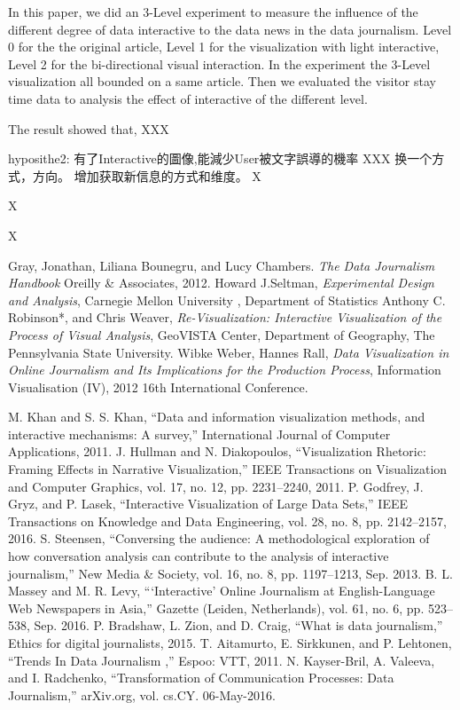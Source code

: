 \documentclass[9pt,journal,compsoc]{IEEEtran}
\begin{document}
In this paper, we did an 3-Level experiment to measure the influence of the different degree of data interactive to the data news in the data journalism.  Level 0 for the the original article, Level 1 for the visualization with light interactive, Level 2 for the bi-directional visual interaction. In the experiment the 3-Level visualization all bounded on a same article. Then we evaluated the visitor stay time data to analysis the effect of interactive of the different level.

The result showed that, XXX

hyposithe2: 有了Interactive的圖像,能減少User被文字誤導的機率
XXX 换一个方式，方向。 增加获取新信息的方式和维度。
X

X

X

\begin{thebibliography}{99}
{} Gray, Jonathan, Liliana Bounegru, and Lucy Chambers. \textit{The Data Journalism Handbook} Oreilly \& Associates, 2012.
 Howard J.Seltman, \textit{Experimental Design and Analysis}, Carnegie Mellon University , Department of Statistics
 Anthony C. Robinson*, and Chris Weaver, \textit{Re-Visualization: Interactive Visualization of the Process of Visual Analysis}, GeoVISTA Center, Department of Geography, The Pennsylvania State University. 
 Wibke Weber, Hannes Rall, \textit{Data Visualization in Online Journalism and Its Implications for the Production Process}, Information Visualisation (IV), 2012 16th International Conference.

 M. Khan and S. S. Khan, “Data and information visualization methods, and interactive mechanisms: A survey,” International Journal of Computer Applications, 2011.
 J. Hullman and N. Diakopoulos, “Visualization Rhetoric: Framing Effects in Narrative Visualization,” IEEE Transactions on Visualization and Computer Graphics, vol. 17, no. 12, pp. 2231–2240, 2011.
 P. Godfrey, J. Gryz, and P. Lasek, “Interactive Visualization of Large Data Sets,” IEEE Transactions on Knowledge and Data Engineering, vol. 28, no. 8, pp. 2142–2157, 2016.
 S. Steensen, “Conversing the audience: A methodological exploration of how conversation analysis can contribute to the analysis of interactive journalism,” New Media \& Society, vol. 16, no. 8, pp. 1197–1213, Sep. 2013.
 B. L. Massey and M. R. Levy, “`Interactive' Online Journalism at English-Language Web Newspapers in Asia,” Gazette (Leiden, Netherlands), vol. 61, no. 6, pp. 523–538, Sep. 2016.
 P. Bradshaw, L. Zion, and D. Craig, “What is data journalism,” Ethics for digital journalists, 2015.
 T. Aitamurto, E. Sirkkunen, and P. Lehtonen, “Trends In Data Journalism ,” Espoo: VTT, 2011.
 N. Kayser-Bril, A. Valeeva, and I. Radchenko, “Transformation of Communication Processes: Data Journalism,” arXiv.org, vol. cs.CY. 06-May-2016. 


\end{thebibliography}
\end{document}
